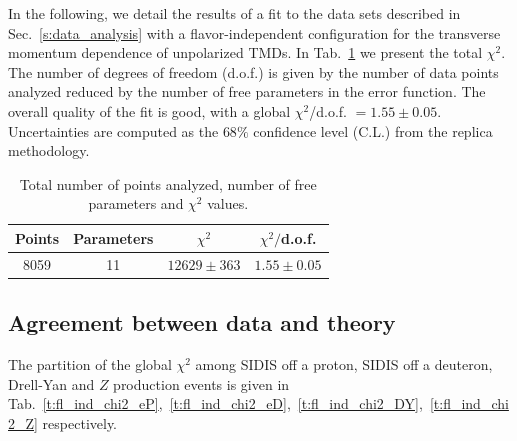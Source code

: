 \documentclass[aps,preprintnumbers,showpacs,nofootinbib,superscriptaddress,floatfix]{revtex4}
\begin{document}
In the following, we detail the results of a fit to the data sets described in Sec.~\ref{s:data_analysis} with a flavor-independent configuration for the transverse momentum dependence of unpolarized TMDs.
In Tab.~\ref{t:fl_ind_chi2} we present the total $\chi^2$. The number of degrees of freedom (d.o.f.) is given by the number of data points analyzed reduced by the number of free parameters in the error function. 
The overall quality of the fit is good, with a global $\chi^2$/d.o.f. $= 1.55 \pm 0.05$. Uncertainties are computed as the $68\%$ confidence level (C.L.) from the replica methodology. 
\begin{table}[h!]
\small
  \centering
  \begin{tabular}{|c|c|c|c|}
\hline
\hline
Points& Parameters & $\chi^2$& $\chi^2/$d.o.f. \\
\hline
8059 & 11  & $12629 \pm 363$ & $1.55 \pm 0.05$ \\
\hline
\hline
\end{tabular}
\caption{Total number of points analyzed, number of free parameters and $\chi^2$ values.}
\label{t:fl_ind_chi2}
\end{table}


\subsection{Agreement between data and theory}
\label{ss:data_vs_theory}

The partition of the global $\chi^2$ among SIDIS off a proton, SIDIS off a
deuteron, Drell-Yan and $Z$ production events is given in
Tab.~\ref{t:fl_ind_chi2_eP},~\ref{t:fl_ind_chi2_eD},~\ref{t:fl_ind_chi2_DY},~\ref{t:fl_ind_chi2_Z}
respectively.  
\end{document}
